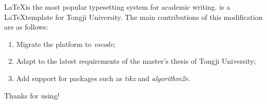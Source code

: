 \begin{eabstract}
  \LaTeX is the most popular typesetting system for academic writing.
  \tongjithesis{} is a \LaTeX template for Tongji University. The main contributions of this modification are as follows:

  \begin{enumerate}[1.]
    \item Migrate the platform to \emph{vscode};
    \item Adapt to the latest requirements of the master's thesis of Tongji University;
    \item Add support for packages such as \emph{tikz} and \emph{algorithm2e}.
  \end{enumerate}

  Thanks for using!
\end{eabstract}

